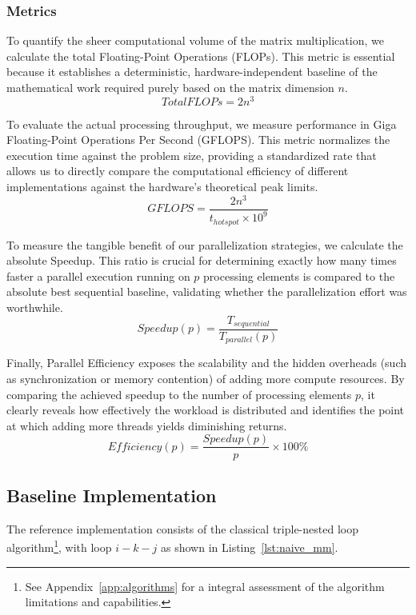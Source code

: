 \subsubsection{Metrics}\label{subsubsec:metrics}
To quantify the sheer computational volume of the matrix multiplication, we calculate the total Floating-Point Operations (FLOPs). This metric is essential because it establishes a deterministic, hardware-independent baseline of the mathematical work required purely based on the matrix dimension $n$.
$$Total FLOPs = 2n^3$$

To evaluate the actual processing throughput, we measure performance in Giga Floating-Point Operations Per Second (GFLOPS). This metric normalizes the execution time against the problem size, providing a standardized rate that allows us to directly compare the computational efficiency of different implementations against the hardware's theoretical peak limits.
$$GFLOPS = \frac{2n^3}{t_{hotspot} \times 10^9}$$

To measure the tangible benefit of our parallelization strategies, we calculate the absolute Speedup. This ratio is crucial for determining exactly how many times faster a parallel execution running on $p$ processing elements is compared to the absolute best sequential baseline, validating whether the parallelization effort was worthwhile.
$$Speedup(p) = \frac{T_{sequential}}{T_{parallel}(p)}$$

Finally, Parallel Efficiency exposes the scalability and the hidden overheads (such as synchronization or memory contention) of adding more compute resources. By comparing the achieved speedup to the number of processing elements $p$, it clearly reveals how effectively the workload is distributed and identifies the point at which adding more threads yields diminishing returns.
$$Efficiency(p) = \frac{Speedup(p)}{p} \times 100\%$$


\subsection{Baseline Implementation}
The reference implementation consists of the classical triple-nested loop algorithm\footnote{See Appendix~\ref{app:algorithms} for a integral assessment of the algorithm limitations and capabilities.}, with loop $i-k-j$ as shown in Listing~\ref{lst:naive_mm}.

